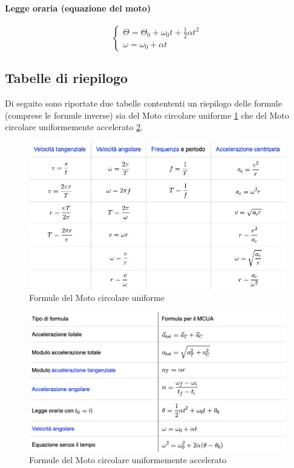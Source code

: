         \paragraph{Legge oraria (equazione del moto)}
        \begin{equation}
            \begin{cases} 
                \Theta = \Theta_0 + \omega_0t + \frac{1}{2}\alpha t^2 \\ 
                \omega = \omega_0+\alpha t
            \end{cases}
        \end{equation}

        \subsection{Tabelle di riepilogo} Di seguito sono riportate due tabelle 
        contententi un riepilogo delle formule (comprese le formule inverse) 
        sia del Moto circolare uniforme \ref{fig:MCU} che del Moto circolare 
        uniformemente accelerato \ref{fig:MCUA}.

        \begin{figure}[H]
            \includegraphics[width=0.9\linewidth]
            {formulario/img/Formulario_MCU.png}
            \caption{Formule del Moto circolare uniforme}
            \label{fig:MCU}
        \end{figure}

        \begin{figure}[H]
            \includegraphics[width=0.9\linewidth]
            {formulario/img/Formulario_MCUA.png}
            \caption{Formule del Moto circolare uniformemente accelerato}
            \label{fig:MCUA}
        \end{figure}

        